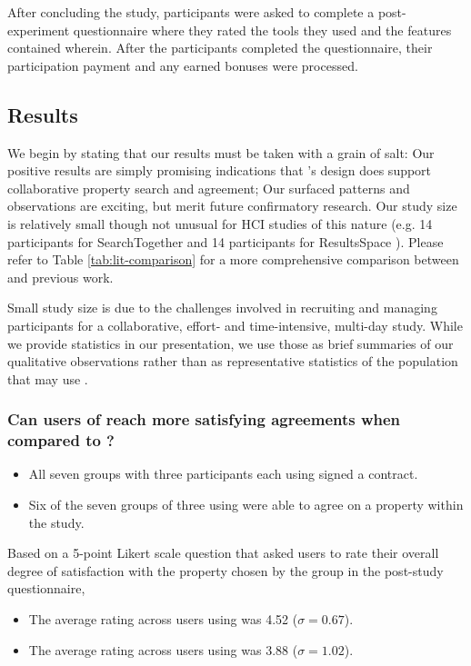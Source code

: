 After concluding the study, participants were asked to complete a post-experiment questionnaire where they rated the tools they used and the features contained wherein. After the participants completed the questionnaire, their participation payment and any earned bonuses were processed. 

\subsection{Results} \label{ssection:results}
We begin by stating that our results must be taken with a grain of salt: Our positive results are simply promising indications that \tool's design does support collaborative property search and agreement; Our surfaced patterns and observations are exciting, but merit future confirmatory research. Our study size is relatively small though not unusual for HCI studies of this nature (e.g. 14 participants for SearchTogether \cite{searchtogether} and 14 participants for ResultsSpace  \cite{TeamSearch}). Please refer to Table \ref{tab:lit-comparison} for a more comprehensive comparison between \tool and previous work. 

Small study size is due to the challenges involved in recruiting and managing participants for a collaborative, effort- and time-intensive, multi-day study. While we provide statistics in our presentation, we use those as brief summaries of our qualitative observations rather than as representative statistics of the population that may use \tool. 


\subsubsection{Can users of \tool reach more satisfying agreements when compared to \baseline?}
\begin{itemize}
    \item All seven groups with three participants each using \tool  signed a contract.
    \item Six of the seven groups of three using \baseline were able to agree on a property within the study.
\end{itemize}

Based on a 5-point Likert scale question that asked users to rate their overall degree of satisfaction with the property chosen by the group in the post-study questionnaire,
\begin{itemize}
    \item The average rating across users using \tool was 4.52 ($\sigma = 0.67$).
    \item The average rating across users using \baseline was 3.88 ($\sigma = 1.02$).
\end{itemize}

